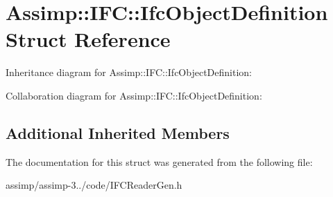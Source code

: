 \hypertarget{struct_assimp_1_1_i_f_c_1_1_ifc_object_definition}{\section{Assimp\+:\+:I\+F\+C\+:\+:Ifc\+Object\+Definition Struct Reference}
\label{struct_assimp_1_1_i_f_c_1_1_ifc_object_definition}
}


Inheritance diagram for Assimp\+:\+:I\+F\+C\+:\+:Ifc\+Object\+Definition\+:


Collaboration diagram for Assimp\+:\+:I\+F\+C\+:\+:Ifc\+Object\+Definition\+:
\subsection*{Additional Inherited Members}


The documentation for this struct was generated from the following file\+:\begin{DoxyCompactItemize}
\item 
assimp/assimp-\/3../code/I\+F\+C\+Reader\+Gen.\+h\end{DoxyCompactItemize}
